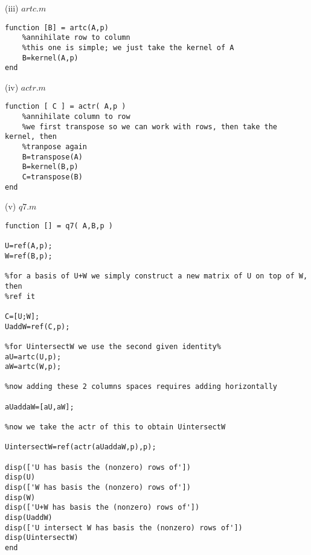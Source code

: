 \documentclass[10pt,a4paper]{report}
\begin{document}
(iii) $artc.m$
\begin{verbatim}
function [B] = artc(A,p)
    %annihilate row to column
    %this one is simple; we just take the kernel of A
    B=kernel(A,p)
end
\end{verbatim}
\vspace{0.5cm}

(iv) $actr.m$
\begin{verbatim}
function [ C ] = actr( A,p )
    %annihilate column to row
    %we first transpose so we can work with rows, then take the kernel, then
    %tranpose again
    B=transpose(A)
    B=kernel(B,p)
    C=transpose(B)
end
\end{verbatim}
\vspace{0.5cm}

(v) $q7.m$

\begin{verbatim}
function [] = q7( A,B,p )

U=ref(A,p);
W=ref(B,p);

%for a basis of U+W we simply construct a new matrix of U on top of W, then
%ref it

C=[U;W];
UaddW=ref(C,p);

%for UintersectW we use the second given identity%
aU=artc(U,p);
aW=artc(W,p);

%now adding these 2 columns spaces requires adding horizontally

aUaddaW=[aU,aW];

%now we take the actr of this to obtain UintersectW

UintersectW=ref(actr(aUaddaW,p),p);

disp(['U has basis the (nonzero) rows of'])
disp(U)
disp(['W has basis the (nonzero) rows of'])
disp(W)
disp(['U+W has basis the (nonzero) rows of'])
disp(UaddW)
disp(['U intersect W has basis the (nonzero) rows of'])
disp(UintersectW)
end

\end{verbatim}
\end{document}
